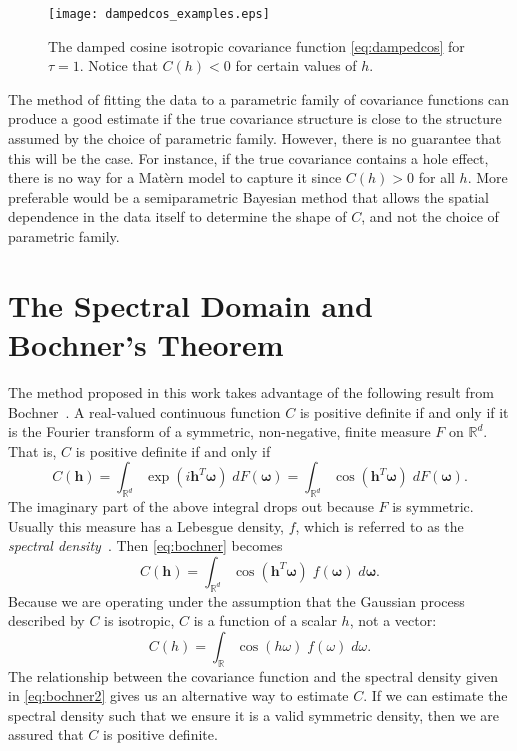 \begin{figure}[!htb]
	\centering
	\texttt{[image: dampedcos\_examples.eps]}
	\caption{\small The damped cosine isotropic covariance function \eqref{eq:dampedcos} for $\tau = 1$. Notice that $C(h) < 0$ for certain values of $h$.}
	\label{fig:dampedcos_examples}
\end{figure}

The method of fitting the data to a parametric family of covariance functions can produce a good estimate if the true covariance structure is close to the structure assumed by the choice of parametric family. However, there is no guarantee that this will be the case. For instance, if the true covariance contains a hole effect, there is no way for a Mat\`ern model to capture it since $C(h) > 0$ for all $h$. More preferable would be a semiparametric Bayesian method that allows the spatial dependence in the data itself to determine the shape of $C$, and not the choice of parametric family.


\section{The Spectral Domain and Bochner's Theorem} %
\label{sec:bochner_s_theorem}

The method proposed in this work takes advantage of the following result from Bochner~\cite{bochner1955harmonic}. A real-valued continuous function $C$ is positive definite if and only if it is the Fourier transform of a symmetric, non-negative, finite measure $F$ on $\mathbb{R}^d$. That is, $C$ is positive definite if and only if
\begin{equation} \label{eq:bochner}
C(\bm{h}) = \int_{\mathbb{R}^d} \exp(i \bm{h}^T \bm{\omega}) \; dF(\bm{\omega}) = \int_{\mathbb{R}^d} \cos(\bm{h}^T \bm{\omega}) \; dF(\bm{\omega}).
\end{equation}
The imaginary part of the above integral drops out because $F$ is symmetric. Usually this measure has a Lebesgue density, $f$, which is referred to as the \emph{spectral density}~\cite{gelfand2010handbook}. Then \eqref{eq:bochner} becomes
\[
C(\bm{h}) = \int_{\mathbb{R}^d} \cos(\bm{h}^T \bm{\omega}) \; f(\bm{\omega}) \; d\bm{\omega}.
\]
Because we are operating under the assumption that the Gaussian process described by $C$ is isotropic, $C$ is a function of a scalar $h$, not a vector:
\begin{equation} \label{eq:bochner2}
C(h) = \int_{\mathbb{R}} \cos(h\omega) \; f(\omega) \; d\omega.
\end{equation}
The relationship between the covariance function and the spectral density given in \eqref{eq:bochner2} gives us an alternative way to estimate $C$. If we can estimate the spectral density such that we ensure it is a valid symmetric density, then we are assured that $C$ is positive definite.

